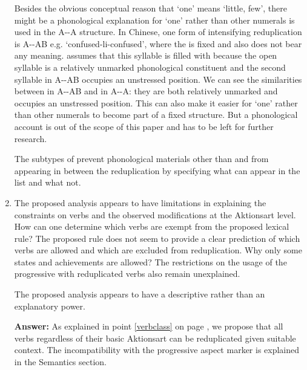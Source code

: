 \documentclass[fleqn,twoside]{article}
\begin{document}
\begin{enumerate}
Besides the obvious conceptual reason that   `one' means `little, few',
there might be a phonological explanation for   `one' rather than other numerals is used in the A--A structure.
In Chinese, one form of intensifying reduplication is A--AB e.g.  `confused-li-confused',
where the  is fixed and also does not bear any meaning.
\citet[137]{Sui2018} assumes that this syllable is filled with  because the open syllable  is a relatively unmarked phonological constituent \citep{Yip1992}
and the second syllable in A--AB occupies an unstressed position.
We can see the similarities between  in A--AB and  in A--A: they are both relatively unmarked and occupies an unstressed position.
This can also make it easier for   `one' rather than other numerals to become part of a fixed structure.
But a phonological account is out of the scope of this paper and has to be left for further research.

The subtypes of  prevent phonological materials other than  and  from appearing in between the reduplication by specifying what can appear in the list and what not.

\item
The proposed analysis appears to have limitations in explaining the constraints on verbs and the observed modifications at the Aktionsart level. How can one determine which verbs are exempt from the proposed lexical rule? The proposed rule does not seem to provide a clear prediction of which verbs are allowed and which are excluded from reduplication. Why only some states and achievements are allowed? The restrictions on the usage of the progressive with reduplicated verbs also remain unexplained.

The proposed analysis appears to have a descriptive rather than an explanatory power.


\textbf{Answer:}
As explained in point \ref{verbclass} on page \pageref{verbclass}, we propose that all verbs regardless of their basic Aktionsart can be reduplicated given suitable context.
The incompatibility with the progressive aspect marker is explained in the Semantics section.



\end{enumerate}
\end{document}
